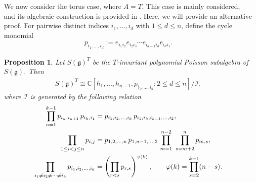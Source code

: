 \documentclass[11pt,reqno]{amsart}
\newtheorem*{theorem A}{Main Theorem A}
\newtheorem*{theorem B}{Main Theorem B}
\newtheorem*{theorem C}{Main Theorem C}
\newtheorem*{theorem D}{Main Theorem D}
\newtheorem{proposition}[theorem]{Proposition}
\theoremstyle{definition}
\theoremstyle{plain}
\theoremstyle{conclusion}
\begin{document}
 We now consider the torus case, where $A = T$. This case is mainly considered, and its algebraic construction is provided in \cite{campoamor2023algebraic}. Here, we will provide an alternative proof. For pairwise distinct indices $i_1,\ldots,i_d$ with $1 \leq d \leq n$, define the cycle monomial \begin{align*}
     p_{i_1,\dots,i_d}:= e_{i_1 i_2}e_{i_2 i_3}\cdots e_{i_{d-1} i_d}e_{i_d i_1}.
 \end{align*}
\begin{proposition}
    Let $S(\mathfrak{g})^T$ be the $T$-invariant polynomial Poisson subalgebra of $S(\mathfrak{g})$. Then \begin{align*}
        S(\mathfrak{g})^T \cong \mathbb{C}[h_1,\ldots,h_{n-1},p_{i_1,\ldots,i_d} : 2 \leq d \leq n] \big/ \mathcal{I} ,
\end{align*} where $\mathcal{I}$ is generated by the following relation \begin{align*}
    \prod_{u=1}^{k-1} p_{i_u,i_{u+1}}\, p_{i_k,i_1}
 &= p_{i_1,i_2,\ldots,i_k}\, p_{i_1,i_k,i_{k-1},\ldots,i_2},
 \notag\\
 \prod_{1 \leq i < j \leq n} p_{i,j}
 &= p_{1,2,\ldots,n}\, p_{1,n-1,\ldots,2}\,
 \prod_{m=1}^{n-2}\ \prod_{s=m+2}^{n} p_{m,s},
 \notag\\
 \prod_{i_1 \neq i_2 \neq \cdots \neq i_k} p_{i_1,i_2,\ldots,i_k}
 &= \left(\prod_{r<s} p_{r,s}\right)^{\varphi(k)},
 \qquad
 \varphi(k)=\prod_{s=2}^{k-1}(n-s). 
\end{align*}
\end{proposition}
\end{document}
